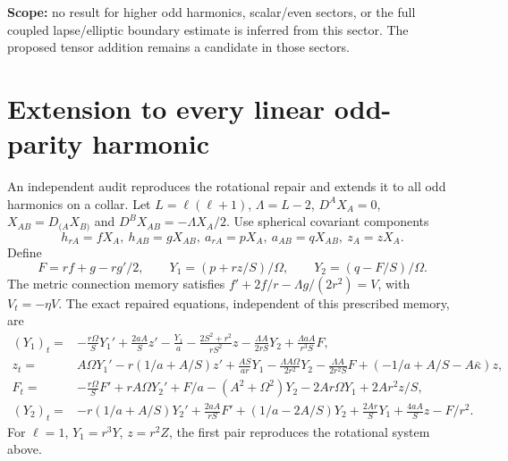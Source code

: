 \documentclass[11pt]{article}
\begin{document}
\textbf{Scope:} no result for higher odd harmonics, scalar/even sectors, or the full coupled lapse/elliptic boundary estimate is inferred from this sector. The proposed tensor addition remains a candidate in those sectors.

\section{Extension to every linear odd-parity harmonic}
An independent audit reproduces the rotational repair and extends it to
all odd harmonics on a collar. Let $L=\ell(\ell+1)$, $\Lambda=L-2$,
$D^AX_A=0$, $X_{AB}=D_{(A}X_{B)}$ and
$D^BX_{AB}=-\Lambda X_A/2$. Use spherical covariant components
\[
h_{rA}=fX_A,\ h_{AB}=gX_{AB},\
a_{rA}=pX_A,\ a_{AB}=qX_{AB},\ z_A=zX_A .
\]
Define
\[
F=rf+g-rg'/2,\qquad
Y_1=(p+rz/S)/\Omega,\qquad Y_2=(q-F/S)/\Omega .
\]
The metric connection memory satisfies
$f'+2f/r-\Lambda g/(2r^2)=V$, with $V_t=-\eta V$.
The exact repaired equations, independent of this prescribed memory, are
\begin{align}
(Y_1)_t={}&-\frac{r\Omega}{S}Y_1'+\frac{2aA}{S}z'
-\frac{Y_1}{a}-\frac{2S^2+r^2}{rS^2}z
-\frac{\Lambda A}{2rS}Y_2+\frac{\Lambda aA}{r^3S}F,\\
z_t={}&A\Omega Y_1'-r(1/a+A/S)z'
+\frac{AS}{ar}Y_1-\frac{\Lambda A\Omega}{2r^2}Y_2
-\frac{\Lambda A}{2r^2S}F+(-1/a+A/S-A\bar\kappa)z,\\
F_t={}&-\frac{r\Omega}{S}F'+rA\Omega Y_2'
+F/a-(A^2+\Omega^2)Y_2-2Ar\Omega Y_1+2Ar^2z/S,\\
(Y_2)_t={}&-r(1/a+A/S)Y_2'+\frac{2aA}{rS}F'
+(1/a-2A/S)Y_2+\frac{2Ar}{S}Y_1+\frac{4aA}{S}z-F/r^2 .
\end{align}
For $\ell=1$, $Y_1=r^3Y$, $z=r^2Z$, the first pair reproduces
the rotational system above.
\end{document}
